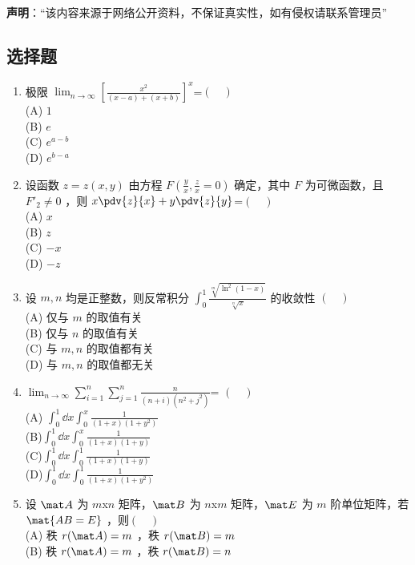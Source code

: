 
\textbf{声明}：“该内容来源于网络公开资料，不保证真实性，如有侵权请联系管理员”

\subsection{选择题}
\begin{enumerate}
\item 极限  $\displaystyle \lim_{n\to\infty}[\frac{x^2}{(x-a)+(x+b)}]^x$=$(\quad )$\\
(A) $1$\\
(B) $e$\\
(C) $e^{a-b}$\\
(D) $e^{b-a}$
\item  设函数 $z=z(x,y)$ 由方程 $\displaystyle F(\frac{y}{x},\frac{z}{x}=0)$ 确定，其中 $F$ 为可微函数，且 $F'_2 \neq0$ ，则  $\displaystyle x \pdv{z}{x}+y\pdv{z}{y}$=$(\quad )$\\
(A)  $x$\\
(B)  $z$\\
(C) $-x$\\
(D)  $-z$
\item 设 $m,n$ 均是正整数，则反常积分 $\displaystyle \int_0^1 \frac{\sqrt[m]{\ln^2(1-x)}}{\sqrt[n]{x}}$ 的收敛性 $(\quad )$\\
(A) 仅与 $m$ 的取值有关\\
(B) 仅与 $n$ 的取值有关\\
(C)  与 $m,n$ 的取值都有关\\
(D)  与 $m,n$ 的取值都无关
\item $\displaystyle \lim_{n\to\infty} \sum_{i=1}^n \sum_{j=1}^n \frac{n}{(n+i)(n^2+j^2)}$= $(\quad )$\\
(A) $\displaystyle \int_{0}^{1}\dd{x}\int_{0}^{x} \frac{1}{(1+x)(1+y^2)}$\\
(B)$\displaystyle \int_{0}^{1}\dd{x}\int_{0}^{x} \frac{1}{(1+x)(1+y)}$\\
(C)$\displaystyle \int_{0}^{1}\dd{x}\int_{0}^{1} \frac{1}{(1+x)(1+y)}$\\
(D)$\displaystyle \int_{0}^{1}\dd{x}\int_{0}^{1} \frac{1}{(1+x)(1+y^2)}$
\item 设 $\mat A$ 为 $m$x$n$ 矩阵，$\mat B$  为 $n$x$m$  矩阵，$\mat E$  为  $m$ 阶单位矩阵，若 $\mat {AB=E}$ ，则$(\quad )$\\
(A) 秩 $r(\mat A)=m$ ，秩  $r(\mat  B)=m$ \\
(B) 秩 $r(\mat A)=m$ ，秩  $r( \mat B)=n$ \\

\end{enumerate}

